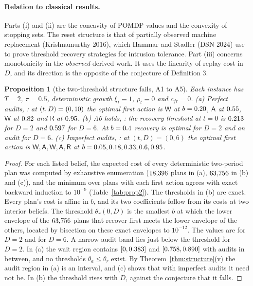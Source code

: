 \documentclass[11pt]{article}
\newtheorem{proposition}[theorem]{Proposition}
\theoremstyle{definition}
\newcommand{\Wa}{\mathsf{W}}
\newcommand{\Aa}{\mathsf{A}}
\newcommand{\Ra}{\mathsf{R}}
\begin{document}
\paragraph{Relation to classical results.} Parts (i) and (ii) are the concavity of POMDP values and the
convexity of stopping sets. The reset structure is that of partially observed machine replacement
(Krishnamurthy 2016), which Hammar and Stadler (DSN 2024) use to prove threshold recovery strategies for
intrusion tolerance. Part (iii) concerns monotonicity in the \emph{observed} derived work. It uses the
linearity of replay cost in $D$, and its direction is the opposite of the conjecture of Definition 3.

\begin{proposition}[the two-threshold structure fails, A1 to A5]\label{prop:counter}
Each instance has $T=2$, $\pi=0.5$, deterministic growth $\xi_t\equiv1$, $\rho_t\equiv0$ and $c_{fr}=0$.
(a) Perfect audits, \PropAParams: at $(t,D)=(0,10)$ the optimal first action is $\Wa$ at
$b=0.20$, $\Aa$ at $0.55$, $\Wa$ at $0.82$ and $\Ra$ at $0.95$.
(b) A6 holds, \PropBParams: the recovery threshold at $t=0$ is $0.213$ for $D=2$ and
$0.597$ for $D=6$. At $b=0.4$ recovery is optimal for $D=2$ and an audit for $D=6$.
(c) Imperfect audits, \PropCParams: at $(t,D)=(0,6)$ the optimal first action is $\Wa,\Aa,\Wa,\Aa,\Ra$ at
$b=0.05, 0.18, 0.33, 0.6, 0.95$.
\end{proposition}
\begin{proof}
For each listed belief, the expected cost of every deterministic two-period plan was computed by exhaustive
enumeration ($18{,}396$ plans in (a), $63{,}756$ in (b) and (c)), and the minimum over plans with each
first action agrees with exact backward induction to $10^{-9}$ (Table~\ref{tab:prop2}). The thresholds in
(b) are exact. Every plan's cost is affine in $b$, and its two coefficients follow from its costs at two
interior beliefs. The threshold $\theta_r(0,D)$ is the smallest $b$ at which the lower envelope of the
$63{,}756$ plans that recover first meets the lower envelope of the others, located by bisection on
these exact envelopes to $10^{-12}$. The values are \PropBThrTwoExact{} for $D=2$ and \PropBThrSixExact{}
for $D=6$. A narrow audit band lies just below the threshold for $D=2$. In (a) the wait region contains $[0,0.383]$ and
$[0.758,0.890]$ with audits in between, and no thresholds $\theta_a\le\theta_r$ exist.
By Theorem~\ref{thm:structure}(v) the audit region in (a) is an interval, and (c) shows that with
imperfect audits it need not be. In (b) the threshold rises with $D$, against the conjecture that it falls.
\end{proof}
\end{document}
